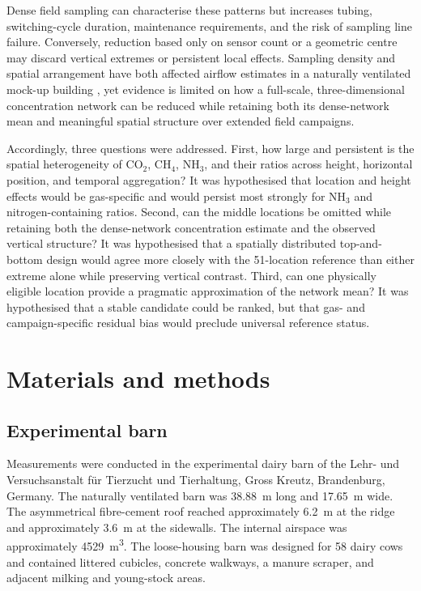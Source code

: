 \documentclass[12pt,a4paper]{article}
\begin{document}
Dense field sampling can characterise these patterns but increases tubing,
switching-cycle duration, maintenance requirements, and the risk of sampling
line failure. Conversely, reduction based only on sensor count or a geometric
centre may discard vertical extremes or persistent local effects. Sampling
density and spatial arrangement have both affected airflow estimates in a
naturally ventilated mock-up building \citep{DeVogeleer2017}, yet evidence is
limited on how a full-scale, three-dimensional concentration network can be
reduced while retaining both its dense-network mean and meaningful spatial
structure over extended field campaigns.

Accordingly, three questions were addressed. First, how large and persistent
is the spatial heterogeneity of \(\mathrm{CO_2}\), \(\mathrm{CH_4}\),
\(\mathrm{NH_3}\), and their ratios across height, horizontal position, and
temporal aggregation? It was hypothesised that location and height effects
would be gas-specific and would persist most strongly for \(\mathrm{NH_3}\)
and nitrogen-containing ratios. Second, can the middle locations be omitted
while retaining both the dense-network concentration estimate and the
observed vertical structure? It was hypothesised that a spatially distributed
top-and-bottom design would agree more closely with the 51-location reference
than either extreme alone while preserving vertical contrast. Third, can one
physically eligible location provide a pragmatic approximation of the network
mean? It was hypothesised that a stable candidate could be ranked, but that
gas- and campaign-specific residual bias would preclude universal reference
status.

\section{Materials and methods}

\subsection{Experimental barn}

Measurements were conducted in the experimental dairy barn of the
Lehr- und Versuchsanstalt f\"ur Tierzucht und Tierhaltung, Gross Kreutz,
Brandenburg, Germany. The naturally ventilated barn was \SI{38.88}{m} long and
\SI{17.65}{m} wide. The asymmetrical fibre-cement roof reached approximately
\SI{6.2}{m} at the ridge and approximately \SI{3.6}{m} at the sidewalls. The
internal airspace was approximately \SI{4529}{m^3}. The loose-housing barn was
designed for 58 dairy cows and contained littered cubicles, concrete
walkways, a manure scraper, and adjacent milking and young-stock areas.
\end{document}
